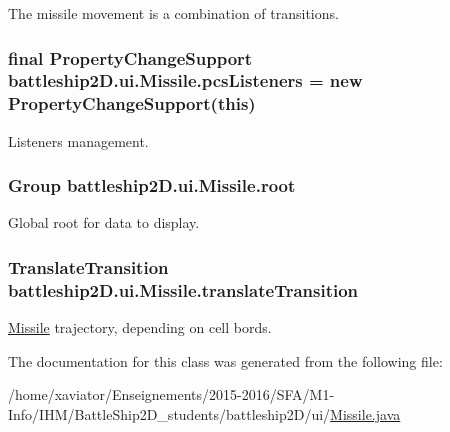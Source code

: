 The missile movement is a combination of transitions. 

\hypertarget{classbattleship2D_1_1ui_1_1Missile_a2c2bbbfecfd52723b7ae22cc10fd0321}{
\subsubsection[{pcs\-Listeners}]{\setlength{\rightskip}{0pt plus 5cm}final Property\-Change\-Support battleship2\-D.\-ui.\-Missile.\-pcs\-Listeners = new Property\-Change\-Support(this)\hspace{0.3cm}{\ttfamily [private]}}}\label{classbattleship2D_1_1ui_1_1Missile_a2c2bbbfecfd52723b7ae22cc10fd0321}


Listeners management. 

\hypertarget{classbattleship2D_1_1ui_1_1Missile_a1629c11210c785af29f5c744425bece5}{
\subsubsection[{root}]{\setlength{\rightskip}{0pt plus 5cm}Group battleship2\-D.\-ui.\-Missile.\-root\hspace{0.3cm}{\ttfamily [private]}}}\label{classbattleship2D_1_1ui_1_1Missile_a1629c11210c785af29f5c744425bece5}


Global root for data to display. 

\hypertarget{classbattleship2D_1_1ui_1_1Missile_ac23e9803151112d2284c60bf83f4d389}{
\subsubsection[{translate\-Transition}]{\setlength{\rightskip}{0pt plus 5cm}Translate\-Transition battleship2\-D.\-ui.\-Missile.\-translate\-Transition\hspace{0.3cm}{\ttfamily [package]}}}\label{classbattleship2D_1_1ui_1_1Missile_ac23e9803151112d2284c60bf83f4d389}


\hyperlink{classbattleship2D_1_1ui_1_1Missile}{Missile} trajectory, depending on cell bords. 



The documentation for this class was generated from the following file\-:\begin{DoxyCompactItemize}
\item 
/home/xaviator/\-Enseignements/2015-\/2016/\-S\-F\-A/\-M1-\/\-Info/\-I\-H\-M/\-Battle\-Ship2\-D\-\_\-students/battleship2\-D/ui/\hyperlink{Missile_8java}{Missile.\-java}\end{DoxyCompactItemize}
